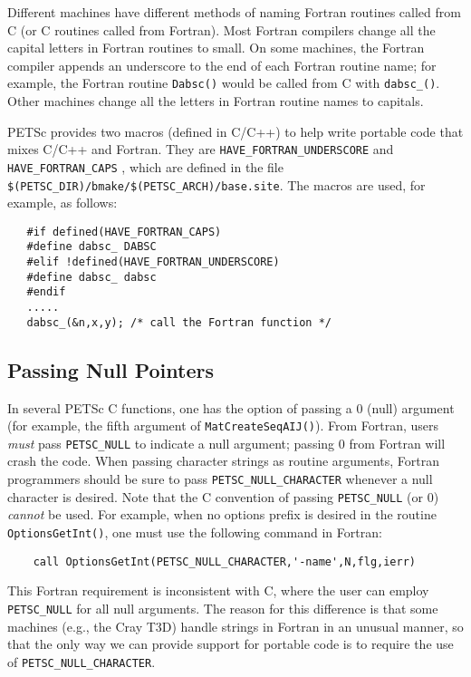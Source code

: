 Different machines have
different methods of naming Fortran routines called from C 
(or C routines called from Fortran). Most Fortran compilers change
all the capital letters in Fortran routines to small. On some machines, the 
Fortran compiler appends an underscore to the end of each Fortran 
routine name; for example, the Fortran routine {\tt Dabsc()}
would be called from C with {\tt dabsc\_()}.  Other machines
change all the letters in Fortran routine names to capitals. 

PETSc provides two macros (defined in C/C++) to help write 
portable code that mixes C/C++ and Fortran. They are 
{\tt HAVE\_FORTRAN\_UNDERSCORE} and {\tt HAVE\_FORTRAN\_CAPS}
 ,
which are defined in the file {\tt \$(PETSC\_DIR)/bmake/\$(PETSC\_ARCH)/base.site}.
The macros are used, for example, as follows:
\begin{verbatim}
   #if defined(HAVE_FORTRAN_CAPS)
   #define dabsc_ DABSC
   #elif !defined(HAVE_FORTRAN_UNDERSCORE)
   #define dabsc_ dabsc
   #endif
   .....
   dabsc_(&n,x,y); /* call the Fortran function */
\end{verbatim}

\subsection{Passing Null Pointers}

In several PETSc C functions, one has the option of passing a 0 (null)
argument (for example, the fifth argument of {\tt MatCreateSeqAIJ()}).
From Fortran, users {\em must} pass {\tt PETSC\_NULL} to indicate a
null argument;  passing 0 from Fortran will crash
the code.  When passing character strings as routine arguments,
Fortran programmers should be sure to pass {\tt PETSC\_NULL\_CHARACTER}
whenever a null character is  desired.  Note
that the C convention of passing {\tt PETSC\_NULL} (or 0) {\em cannot}
be used.  For example, when no options prefix is desired in the
routine {\tt OptionsGetInt()}, one must use the following command in
Fortran:
\begin{verbatim}
    call OptionsGetInt(PETSC_NULL_CHARACTER,'-name',N,flg,ierr)
\end{verbatim}

This Fortran requirement is inconsistent with C, where the 
user can employ {\tt PETSC\_NULL} for all null arguments. The reason
for this difference is that some machines (e.g., the Cray T3D)
handle strings in Fortran in an unusual manner, so that
the only way we can provide support for portable code
is to require the use of {\tt PETSC\_NULL\_CHARACTER}.

